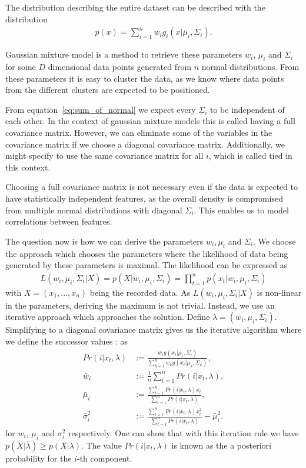 The distribution describing the entire dataset can be described with the distribution
\begin{align}
	\label{eq:sum_of_normal}
	p(x) = \sum_{i=1}^{n} w_i g_i(x|\mu_i, \Sigma_i).
\end{align}

Gaussian mixture model is a method to retrieve these parameters $w_i$, $\mu_i$ and $\Sigma_i$ for some $D$ dimensional data points generated from $n$ normal distributions. From these parameters it is easy to cluster the data, as we know where data points from the different clusters are expected to be positioned.

From equation~\ref{eq:sum_of_normal} we expect every $\Sigma_i$ to be independent of each other. In the context of gaussian mixture models this is called having a full covariance matrix. However, we can eliminate some of the variables in the covariance matrix if we choose a diagonal covariance matrix. Additionally, we might specify to use the same covariance matrix for all $i$, which is called tied in this context.

Choosing a full covariance matrix is not necessary even if the data is expected to have statistically independent features, as the overall density is compromised from multiple normal distributions with diagonal $\Sigma_i$. This enables us to model correlations between features.

The question now is how we can derive the parameters $w_i, \mu_i$ and $\Sigma_i$. We choose the approach which chooses the parameters where the likelihood of data being generated by these parameters is maximal. The likelihood can be expressed as
\begin{align*}
	L(w_i, \mu_i, \Sigma_i|X) = p(X|w_i, \mu_i, \Sigma_i) = \prod_{t=1}^n p(x_t|w_i, \mu_i, \Sigma_i)
\end{align*}
with $X = (x_1, ..., x_n)$ being the recorded data. As $L(w_i, \mu_i, \Sigma_i|X)$ is non-linear in the parameters, deriving the maximum is not trivial. Instead, we use an iterative approach which approaches the solution. Define $\lambda = (w_i, \mu_i, \Sigma_i)$. Simplifying to a diagonal covariance matrix gives us the iterative algorithm where we define the successor values $\bar{.}$ as
\begin{align*}
	Pr(i | x_t, \lambda) &:= \frac{w_i g(x_t | \mu_i, \Sigma_i)}{\sum_{k=1}^{n} w_k g(x_t | \mu_k, \Sigma_k)},\\
	\bar{w}_i &:= \frac{1}{n} \sum_{t=1}^{n} Pr(i | x_t, \lambda),\\
	\bar{\mu}_i &:= \frac{\sum_{t=1}^{n} Pr(i | x_t, \lambda) x_t}{\sum_{t=1}^{n} Pr(i | x_t, \lambda)},\\
	\bar{\sigma}_i^2 &:= \frac{\sum_{t=1}^{n} Pr(i | x_t, \lambda) x_t^2}{\sum_{t=1}^{n} Pr(i | x_t, \lambda)} - \bar{\mu}_i^2.
\end{align*}
for $w_i$, $\mu_i$ and $\sigma_i^2$ respectively. One can show that with this iteration rule we have $p(X|\bar{\lambda}) \geq p(X|\lambda)$. The value $Pr(i|x_t, \lambda)$ is known as the a posteriori probability for the $i$-th component.

